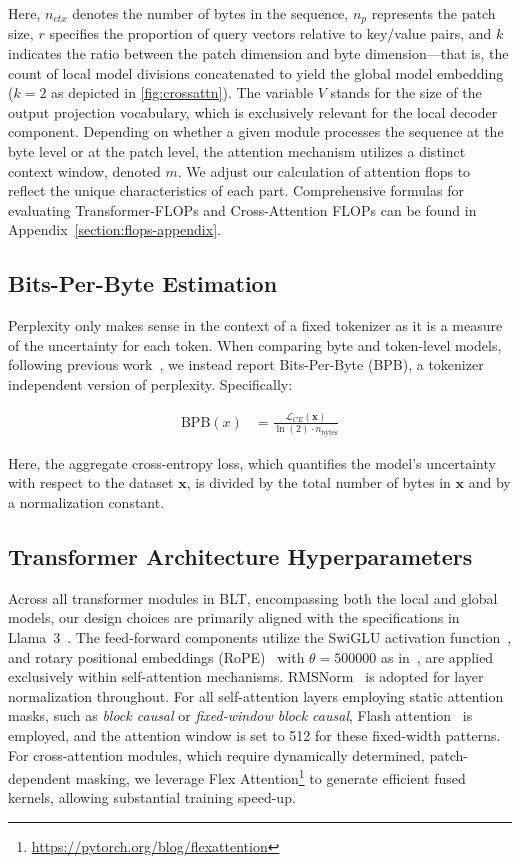 Here, $n_{ctx}$ denotes the number of bytes in the sequence, $n_p$ represents the patch size, $r$ specifies the proportion of query vectors relative to key/value pairs, and $k$ indicates the ratio between the patch dimension and byte dimension—that is, the count of local model divisions concatenated to yield the global model embedding ($k=2$ as depicted in \autoref{fig:crossattn}). The variable $V$ stands for the size of the output projection vocabulary, which is exclusively relevant for the local decoder component. Depending on whether a given module processes the sequence at the byte level or at the patch level, the attention mechanism utilizes a distinct context window, denoted $m$. We adjust our calculation of attention flops to reflect the unique characteristics of each part. Comprehensive formulas for evaluating Transformer-FLOPs and Cross-Attention FLOPs can be found in Appendix~\ref{section:flops-appendix}.

\subsection{Bits-Per-Byte Estimation} Perplexity only makes sense in the context of a fixed tokenizer as it is a measure of the uncertainty for each token. When comparing byte and token-level models, following previous work~\citep{xue2022byt5, yu2023megabyte, wang2024mambabyte}, we instead report Bits-Per-Byte (BPB), a tokenizer independent version of perplexity. Specifically:

\begin{align}
    \text{BPB}(x)&= \frac{\mathcal{L}_{CE}(\pmb{x})}{\ln(2)\cdot n_{\text{bytes}}}
\end{align}

Here, the aggregate cross-entropy loss, which quantifies the model's uncertainty with respect to the dataset $\pmb{x}$, is divided by the total number of bytes in $\pmb{x}$ and by a normalization constant.

\subsection{Transformer Architecture Hyperparameters} 

Across all transformer modules in {\textsc BLT}, encompassing both the local and global models, our design choices are primarily aligned with the specifications in Llama~3~\citep{dubey2024llama}. The feed-forward components utilize the SwiGLU activation function~\citep{swiglu}, and rotary positional embeddings (RoPE)~\citep{RoPe} with $\theta=500000$ as in~\citep{xiong2024effective}, are applied exclusively within self-attention mechanisms. RMSNorm~\citep{RMSNorm} is adopted for layer normalization throughout. For all self-attention layers employing static attention masks, such as \textit{block causal} or \textit{fixed-window block causal}, Flash attention~\citep{dao2022flashattention} is employed, and the attention window is set to 512 for these fixed-width patterns. For cross-attention modules, which require dynamically determined, patch-dependent masking, we leverage Flex Attention\footnote{\url{https://pytorch.org/blog/flexattention}} to generate efficient fused kernels, allowing substantial training speed-up.

